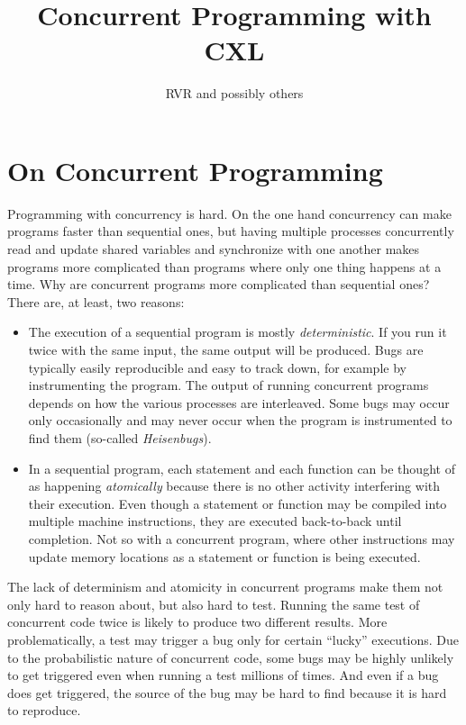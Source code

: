 \documentclass{report}
\title{Concurrent Programming with CXL}
\author{RVR and possibly others}
\begin{document}
\maketitle
\tableofcontents

\chapter{On Concurrent Programming}

Programming with concurrency is hard.  On the one hand concurrency
can make programs faster than sequential ones, but having multiple
processes concurrently read and update shared variables and
synchronize with one another makes programs more complicated than
programs where only one thing happens at a time.  Why are concurrent
programs more complicated than sequential ones?
There are, at least, two reasons:
\begin{itemize}
\item The execution of a sequential program is mostly \emph{deterministic}.
If you run it twice with the same input, the same output will be produced.
Bugs are typically easily reproducible and easy to track down, for example
by instrumenting the program.
The output of running concurrent programs depends on how the various
processes are interleaved.  Some bugs may occur only occasionally and
may never occur when the program is instrumented to find them
(so-called \emph{Heisenbugs}).
\item In a sequential program, each statement and each function can be
thought of as happening \emph{atomically}
because there is no other activity
interfering with their execution.  Even though a statement or function may
be compiled into multiple machine instructions, they are executed back-to-back
until completion.  Not so with a concurrent program, where other instructions
may update memory locations as a statement or function is being executed.
\end{itemize}
The lack of determinism and atomicity in concurrent programs make them
not only hard to reason about, but also hard to test.
Running the same test of concurrent code twice is likely to produce
two different results.  More problematically, a test may trigger a
bug only for certain ``lucky'' executions.  Due to the probabilistic
nature of concurrent code, some bugs may be highly unlikely to get
triggered even when running a test millions of times.  And even if
a bug does get triggered, the source of the bug may be hard to find
because it is hard to reproduce.
\end{document}
